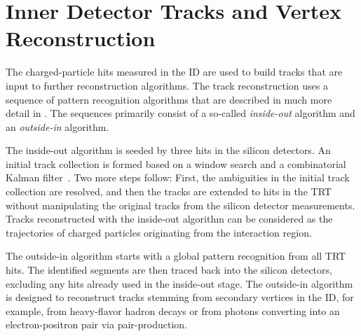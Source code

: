 

\section{Inner Detector Tracks and Vertex Reconstruction}
The charged-particle hits measured in the ID are used to build tracks that are input to further reconstruction algorithms.
The track reconstruction uses a sequence of pattern recognition algorithms that are described in much more detail in . The sequences primarily consist of a so-called \emph{inside-out} algorithm and an \emph{outside-in} algorithm.

The inside-out algorithm is seeded by three hits in the silicon detectors. An initial track collection is formed based on a window search and a combinatorial Kalman filter~\cite{fruhwirth_application_1987}. Two more steps follow: First, the ambiguities in the initial track collection are resolved, and then the tracks are extended to hits in the TRT without manipulating the original tracks from the silicon detector measurements. Tracks reconstructed with the inside-out algorithm can be considered as the trajectories of charged particles originating from the interaction region.

The outside-in algorithm starts with a global pattern recognition from all TRT hits. The identified segments are then traced back into the silicon detectors, excluding any hits already used in the inside-out stage. The outside-in algorithm is designed to reconstruct tracks stemming from secondary vertices in the ID, for example, from heavy-flavor hadron decays or from photons converting into an electron-positron pair via pair-production.


